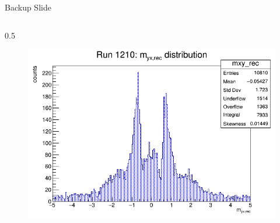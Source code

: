 \documentclass{beamer}[10pt]
\begin{document}
\begin{frame}{Backup Slide}
\begin{columns}
\begin{column}{0.5\framewidth}
\begin{figure}[H]
  \centering
  \includegraphics[width= \textwidth]{figures/pdf/mxy_rec.png}
  \label{fig:enter-label}
\end{figure}
\end{column}
\end{columns}
\end{frame}
\end{document}
